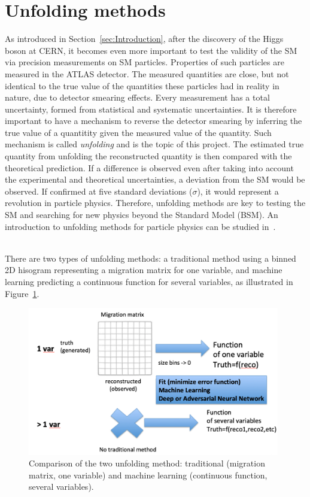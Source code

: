 \section{Unfolding methods}
\label{sec:UnfoldingMethods}

As introduced in Section~\ref{sec:Introduction}, after the discovery of the Higgs boson at CERN, it becomes even more important to test the validity of the SM via precision measurements on SM particles. Properties of such particles are measured in the ATLAS detector. The measured quantities are close, but not identical to the true value of the quantities these particles had in reality in nature, due to detector smearing effects. Every measurement has a total uncertainty, formed from statistical and systematic uncertainties. It is therefore important to have a mechanism to reverse the detector smearing by inferring the true value of a quantitity given the measured value of the quantity. Such mechanism is called \emph{unfolding} and is the topic of this project. The estimated true quantity from unfolding the reconstructed quantity is then compared with the theoretical prediction. If a difference is observed even after taking into account the experimental and theoretical uncertainties, a deviation from the SM would be observed. If confirmed at five standard deviations ($\sigma$), it would represent a revolution in particle physics. Therefore, unfolding methods are key to testing the SM and searching for new physics beyond the Standard Model (BSM). An introduction to unfolding methods for particle physics can be studied in~\cite{UnfoldingStatSchool}.

\ \\There are two types of unfolding methods: a traditional method using a binned 2D hisogram representing a migration matrix for one variable, and machine learning predicting a continuous function for several variables, as illustrated in Figure~\ref{fig:TwoUnfoldingTechniques}. 

\begin{figure}[t]
  \centering
  \includegraphics[width=0.98\textwidth]{../presentation/plots/Unfolding_Traditional_ML.png}
  \caption{Comparison of the two unfolding method: traditional (migration matrix, one variable) and machine learning (continuous function, several variables).}
  \label{fig:TwoUnfoldingTechniques}
\end{figure}

